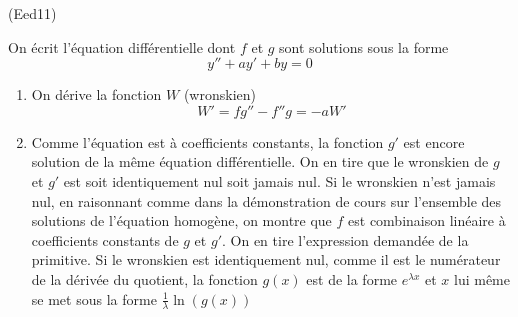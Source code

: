 \begin{tiny}(Eed11)\end{tiny}
On écrit l'équation différentielle dont $f$ et $g$ sont solutions sous la forme
\begin{displaymath}
  y'' +ay' +by = 0
\end{displaymath}
\begin{enumerate}
  \item On dérive la fonction $W$ (wronskien)
\begin{displaymath}
  W' = fg'' - f''g = -aW'
\end{displaymath}
\item Comme l'équation est à coefficients constants, la fonction $g'$ est encore solution de la même équation différentielle. On en tire que le wronskien de $g$ et $g'$ est soit identiquement nul soit jamais nul.\newline
Si le wronskien n'est jamais nul, en raisonnant comme dans la démonstration de cours sur l'ensemble des solutions de l'équation homogène, on montre que $f$ est combinaison linéaire à coefficients constants de $g$ et $g'$. On en tire l'expression demandée de la primitive.\newline
Si le wronskien est identiquement nul, comme il est le numérateur de la dérivée du quotient, la fonction $g(x)$ est de la forme $e^{\lambda x}$ et $x$ lui même se met sous la forme $\frac{1}{\lambda}\ln(g(x))$
\end{enumerate}

